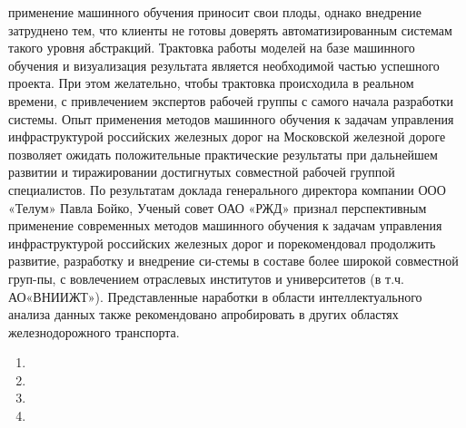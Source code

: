 применение машинного обучения приносит свои плоды, однако внедрение затруднено тем, что клиенты не готовы доверять автоматизированным системам такого уровня абстракций. Трактовка работы моделей на базе машинного обучения и визуализация результата является необходимой частью успешного проекта. При этом желательно, чтобы трактовка происходила в реальном времени, с привлечением экспертов рабочей группы с самого начала разработки системы.
Опыт применения методов машинного обучения к задачам управления инфраструктурой российских железных дорог на Московской железной дороге  позволяет  ожидать  положительные  практические результаты при дальнейшем развитии и тиражировании достигнутых совместной рабочей группой специалистов.
По  результатам  доклада  генерального  директора  компании  ООО «Телум»  Павла  Бойко, Ученый  совет  ОАО «РЖД»  признал  перспективным применение современных методов машинного обучения к задачам управления инфраструктурой российских железных дорог и порекомендовал продолжить развитие, разработку и внедрение си-стемы в составе более широкой совместной груп-пы, с вовлечением отраслевых институтов и университетов (в т.ч. АО«ВНИИЖТ»). Представленные наработки в области интеллектуального анализа данных также рекомендовано апробировать в других областях железнодорожного транспорта.

\begin{enumerate}
  \item {}
  \item {}
  \item {}
  \item {}
\end{enumerate}
